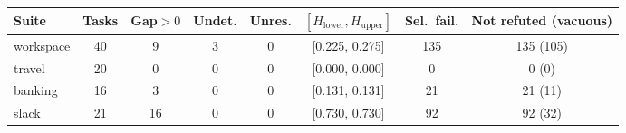 \begin{tabular}{lccccccc}
\toprule
Suite & Tasks & Gap$>0$ & Undet. & Unres. & $[H_{\mathrm{lower}}, H_{\mathrm{upper}}]$ & Sel.\ fail. & Not refuted (vacuous) \\
\midrule
workspace & 40 & 9 & 3 & 0 & [0.225, 0.275] & 135 & 135 (105) \\
travel & 20 & 0 & 0 & 0 & [0.000, 0.000] & 0 & 0 (0) \\
banking & 16 & 3 & 0 & 0 & [0.131, 0.131] & 21 & 21 (11) \\
slack & 21 & 16 & 0 & 0 & [0.730, 0.730] & 92 & 92 (32) \\
\bottomrule
\end{tabular}
